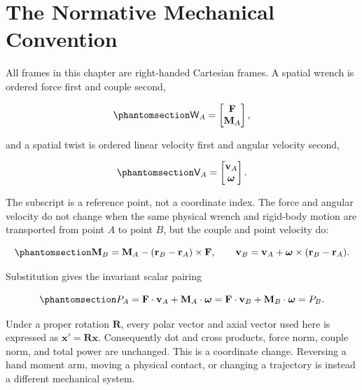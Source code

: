 \documentclass[
  letterpaper,
]{report}
\begin{document}
\section{The Normative Mechanical
Convention}\label{the-normative-mechanical-convention}

All frames in this chapter are right-handed Cartesian frames. A spatial
wrench is ordered force first and couple second,

\begin{equation}\phantomsection\label{eq-advanced-wrench-order}{
\mathsf W_A=
\begin{bmatrix}
\mathbf F\\
\mathbf M_A
\end{bmatrix},
}\end{equation}

and a spatial twist is ordered linear velocity first and angular
velocity second,

\begin{equation}\phantomsection\label{eq-advanced-twist-order}{
\mathsf V_A=
\begin{bmatrix}
\mathbf v_A\\
\boldsymbol\omega
\end{bmatrix}.
}\end{equation}

The subscript is a reference point, not a coordinate index. The force
and angular velocity do not change when the same physical wrench and
rigid-body motion are transported from point \(A\) to point \(B\), but
the couple and point velocity do:

\begin{equation}\phantomsection\label{eq-advanced-point-transport}{
\mathbf M_B=\mathbf M_A-(\mathbf r_B-\mathbf r_A)\times\mathbf F,
\qquad
\mathbf v_B=\mathbf v_A+
\boldsymbol\omega\times(\mathbf r_B-\mathbf r_A).
}\end{equation}

Substitution gives the invariant scalar pairing

\begin{equation}\phantomsection\label{eq-advanced-power-invariance}{
P_A=\mathbf F\cdot\mathbf v_A+
\mathbf M_A\cdot\boldsymbol\omega
=
\mathbf F\cdot\mathbf v_B+
\mathbf M_B\cdot\boldsymbol\omega=P_B.
}\end{equation}

Under a proper rotation \(\mathbf R\), every polar vector and axial
vector used here is expressed as \(\mathbf x'=\mathbf R\mathbf x\).
Consequently dot and cross products, force norm, couple norm, and total
power are unchanged. This is a coordinate change. Reversing a hand
moment arm, moving a physical contact, or changing a trajectory is
instead a different mechanical system.
\end{document}
